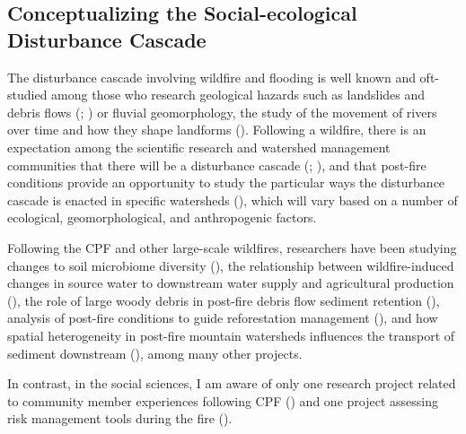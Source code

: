 \documentclass[
]{article}
\begin{document}
\subsection{Conceptualizing the Social-ecological Disturbance Cascade}\label{conceptualizing-the-social-ecological-disturbance-cascade}

The disturbance cascade involving wildfire and flooding is well known and oft-studied among those who research geological hazards such as landslides and debris flows (; ) or fluvial geomorphology, the study of the movement of rivers over time and how they shape landforms (). Following a wildfire, there is an expectation among the scientific research and watershed management communities that there will be a disturbance cascade (; ), and that post-fire conditions provide an opportunity to study the particular ways the disturbance cascade is enacted in specific watersheds (), which will vary based on a number of ecological, geomorphological, and anthropogenic factors.

Following the CPF and other large-scale wildfires, researchers have been studying changes to soil microbiome diversity (), the relationship between wildfire-induced changes in source water to downstream water supply and agricultural production (), the role of large woody debris in post-fire debris flow sediment retention (), analysis of post-fire conditions to guide reforestation management (), and how spatial heterogeneity in post-fire mountain watersheds influences the transport of sediment downstream (), among many other projects.

In contrast, in the social sciences, I am aware of only one research project related to community member experiences following CPF () and one project assessing risk management tools during the fire ().
\end{document}
